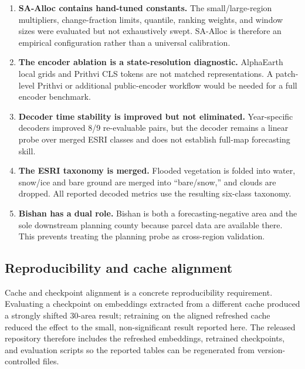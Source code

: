\documentclass{article}
\begin{document}
\begin{enumerate}
\item \label{lim:magic_numbers} \textbf{SA-Alloc contains hand-tuned constants.} The small/large-region multipliers, change-fraction limits, quantile, ranking weights, and window sizes were evaluated but not exhaustively swept. SA-Alloc is therefore an empirical configuration rather than a universal calibration.

\item \label{lim:encoder_ablation} \textbf{The encoder ablation is a state-resolution diagnostic.} AlphaEarth local grids and Prithvi CLS tokens are not matched representations. A patch-level Prithvi or additional public-encoder workflow would be needed for a full encoder benchmark.

\item \label{lim:decoder_stability} \textbf{Decoder time stability is improved but not eliminated.} Year-specific decoders improved 8/9 re-evaluable pairs, but the decoder remains a linear probe over merged ESRI classes and does not establish full-map forecasting skill.

\item \label{lim:esri_classes} \textbf{The ESRI taxonomy is merged.} Flooded vegetation is folded into water, snow/ice and bare ground are merged into ``bare/snow,'' and clouds are dropped. All reported decoded metrics use the resulting six-class taxonomy.

\item \label{lim:bishan_role} \textbf{Bishan has a dual role.} Bishan is both a forecasting-negative area and the sole downstream planning county because parcel data are available there. This prevents treating the planning probe as cross-region validation.
\end{enumerate}

\subsection{Reproducibility and cache alignment}
\label{sec:reproducibility_discussion}

Cache and checkpoint alignment is a concrete reproducibility requirement. Evaluating a checkpoint on embeddings extracted from a different cache produced a strongly shifted 30-area result; retraining on the aligned refreshed cache reduced the effect to the small, non-significant result reported here. The released repository therefore includes the refreshed embeddings, retrained checkpoints, and evaluation scripts so the reported tables can be regenerated from version-controlled files.
\end{document}

